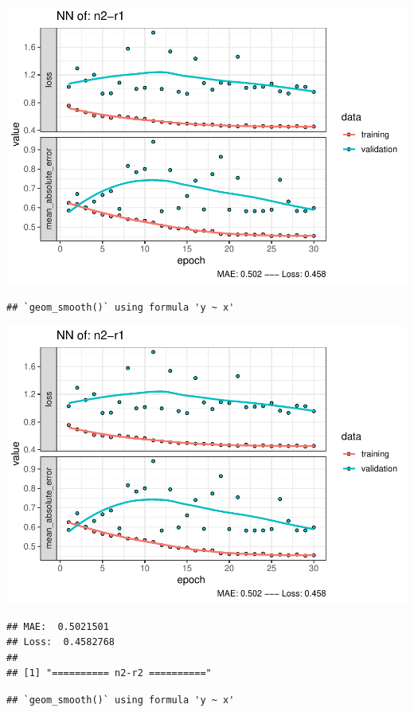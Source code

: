 \documentclass[
]{article}
\begin{document}
\includegraphics{project-code_files/figure-latex/unnamed-chunk-18-17.pdf}

\begin{verbatim}
## `geom_smooth()` using formula 'y ~ x'
\end{verbatim}

\includegraphics{project-code_files/figure-latex/unnamed-chunk-18-18.pdf}

\begin{verbatim}
## MAE:  0.5021501
## Loss:  0.4582768 
## 
## [1] "========== n2-r2 =========="
\end{verbatim}

\begin{verbatim}
## `geom_smooth()` using formula 'y ~ x'
\end{verbatim}
\end{document}
